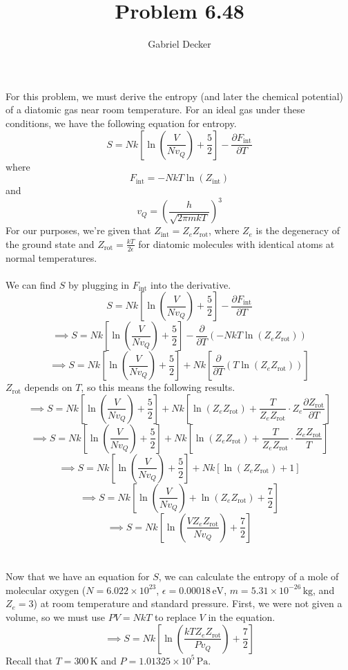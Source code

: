 \documentclass[12pt]{article}
\title{Problem 6.48}
\author{Gabriel Decker}
\newcommand{\atmP}{1.01325\times10^5\,\text{Pa}}
\newcommand{\partDeriv}[2]{\frac{\partial #1}{\partial #2}}
\begin{document}
\maketitle
\begin{flushleft}


For this problem, we must derive the entropy (and later the chemical potential) of a diatomic gas near room temperature.
For an ideal gas under these conditions, we have the following equation for entropy.
\begin{equation}
    S=Nk\left[\ln\left(\frac{V}{Nv_Q}\right)+\frac{5}{2}\right]-\partDeriv{F_\text{int}}{T}
\end{equation}
where
\begin{equation}
    F_\text{int}=-NkT\ln(Z_\text{int})
\end{equation}
and
\begin{equation}
    v_Q=\left(\frac{h}{\sqrt{2\pi mkT}}\right)^3
\end{equation}
For our purposes, we're given that $Z_\text{int}=Z_eZ_\text{rot}$, where $Z_e$ is the degeneracy of the ground state and $Z_\text{rot}=\frac{kT}{2\epsilon}$ for diatomic molecules with identical atoms at normal temperatures.\\~\\

We can find $S$ by plugging in $F_\text{int}$ into the derivative.
$$S=Nk\left[\ln\left(\frac{V}{Nv_Q}\right)+\frac{5}{2}\right]-\partDeriv{F_\text{int}}{T}$$
$$\implies S=Nk\left[\ln\left(\frac{V}{Nv_Q}\right)+\frac{5}{2}\right]-\partDeriv{}{T}(-NkT\ln(Z_eZ_\text{rot}))$$
$$\implies S=Nk\left[\ln\left(\frac{V}{Nv_Q}\right)+\frac{5}{2}\right]+Nk\left[\partDeriv{}{T}(T\ln(Z_eZ_\text{rot}))\right]$$
$Z_\text{rot}$ depends on $T$, so this means the following results.
$$\implies S=Nk\left[\ln\left(\frac{V}{Nv_Q}\right)+\frac{5}{2}\right]+Nk\left[\ln(Z_eZ_\text{rot})+\frac{T}{Z_eZ_\text{rot}}\cdot Z_e\partDeriv{Z_\text{rot}}{T}\right]$$
$$\implies S=Nk\left[\ln\left(\frac{V}{Nv_Q}\right)+\frac{5}{2}\right]+Nk\left[\ln(Z_eZ_\text{rot})+\frac{T}{Z_eZ_\text{rot}}\cdot \frac{Z_eZ_\text{rot}}{T}\right]$$
$$\implies S=Nk\left[\ln\left(\frac{V}{Nv_Q}\right)+\frac{5}{2}\right]+Nk\left[\ln(Z_eZ_\text{rot})+1\right]$$
$$\implies S=Nk\left[\ln\left(\frac{V}{Nv_Q}\right)+\ln(Z_eZ_\text{rot})+\frac{7}{2}\right]$$
$$\implies S=Nk\left[\ln\left(\frac{VZ_eZ_\text{rot}}{Nv_Q}\right)+\frac{7}{2}\right]$$\\~\\

Now that we have an equation for $S$, we can calculate the entropy of a mole of molecular oxygen ($N=6.022\times10^{23}$, $\epsilon=0.00018\,\text{eV}$, $m=5.31\times10^{-26}\,\text{kg}$, and $Z_e=3$) at room temperature and standard pressure.
First, we were not given a volume, so we must use $PV=NkT$ to replace $V$ in the equation.
$$\implies S=Nk\left[\ln\left(\frac{kTZ_eZ_\text{rot}}{Pv_Q}\right)+\frac{7}{2}\right]$$
Recall that $T=300\,\text{K}$ and $P=\atmP$.\\~\\


\end{flushleft}
\end{document}

